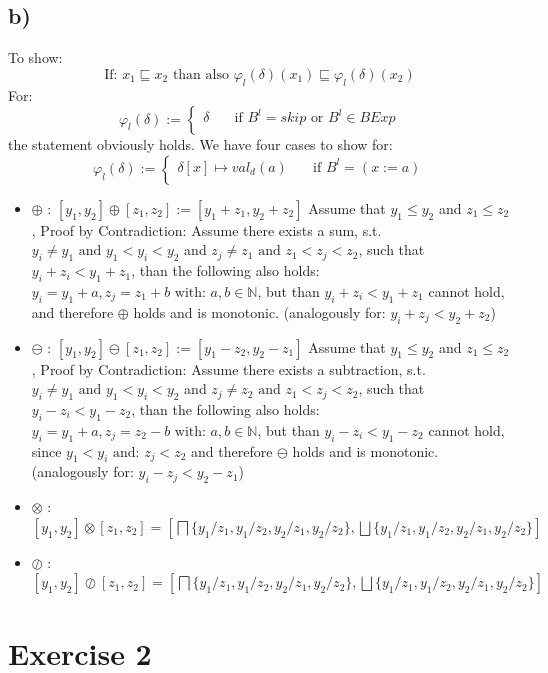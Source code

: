 \documentclass[fleqn,12pt]{article}
\begin{document}
\subsection*{b)}
To show:
$$\text{If: }x_1 \sqsubseteq x_2 \text{ than also } \varphi_l(\delta)(x_1) \sqsubseteq \varphi_l(\delta)(x_2)$$
For:
\[ \varphi_l(\delta) :=
  \begin{cases}
    \delta       & \quad \text{if } B^l = skip \text{ or } B^l \in BExp\\
  \end{cases}
\]
the statement obviously holds.
We have four cases to show for:
\[ \varphi_l(\delta) :=
  \begin{cases}
    \delta [x] \mapsto val_d(a) & \quad \text{if } B^l=(x:=a)\\
  \end{cases}
\]
\begin{itemize}
	\item{$\oplus$ :} $[y_1,y_2] \oplus [z_1,z_2] := [y_1+z_1,y_2+z_2]$ Assume that $y_1 \leq y_2$ and $z_1 \leq z_2$, Proof by Contradiction: Assume there exists a sum, s.t. $y_i \neq y_1 \text{ and } y_1<y_i<y_2$ and $z_j \neq z_1 \text{ and } z_1<z_j<z_2$, such that $y_i+z_i<y_1+z_1$, than the following also holds: $y_i=y_1+a,z_j=z_1+b \text{ with: } a,b\in \mathbb{N}$, but than $y_i+z_i<y_1+z_1$ cannot hold, and therefore $\oplus$ holds and is monotonic. (analogously for: $y_i+z_j<y_2+z_2$)
	\item{$\ominus$ :} $[y_1,y_2] \ominus [z_1,z_2] := [y_1-z_2,y_2-z_1]$ Assume that $y_1 \leq y_2$ and $z_1 \leq z_2$, Proof by Contradiction: Assume there exists a subtraction, s.t. $y_i \neq y_1 \text{ and } y_1<y_i<y_2$ and $z_j \neq z_2 \text{ and } z_1<z_j<z_2$, such that $y_i-z_i<y_1-z_2$, than the following also holds: $y_i=y_1+a,z_j=z_2-b \text{ with: } a,b\in \mathbb{N}$, but than $y_i-z_i<y_1-z_2$ cannot hold, since $y_1<y_i \text{ and: } z_j<z_2$ and therefore $\ominus$ holds and is monotonic. (analogously for: $y_i-z_j<y_2-z_1$)
	\item{$\otimes$ :} $[y_1,y_2] \otimes [z_1,z_2]=[\bigsqcap\{y_1/z_1,y_1/z_2,y_2/z_1,y_2/z_2\},\bigsqcup\{y_1/z_1,y_1/z_2,y_2/z_1,y_2/z_2\}]$
	\item{$\oslash$ :} $[y_1,y_2] \oslash [z_1,z_2]=[\bigsqcap\{y_1/z_1,y_1/z_2,y_2/z_1,y_2/z_2\},\bigsqcup\{y_1/z_1,y_1/z_2,y_2/z_1,y_2/z_2\}]$
\end{itemize}

\section*{Exercise 2}
\end{document}
